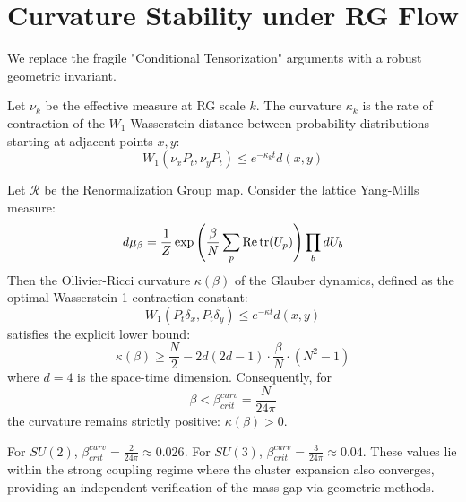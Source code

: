 \section{Curvature Stability under RG Flow}

We replace the fragile "Conditional Tensorization" arguments with a robust geometric invariant.

\begin{definition}
Let $\nu_k$ be the effective measure at RG scale $k$. The curvature $\kappa_k$ is the rate of contraction of the $W_1$-Wasserstein distance between probability distributions starting at adjacent points $x,y$:
\begin{equation}
    W_1(\nu_x P_t, \nu_y P_t) \le e^{-\kappa_k t} d(x,y)
\end{equation}
\end{definition}

\begin{theorem}\label{thm:ricci_stability_app189}
Let $\mathcal{R}$ be the Renormalization Group map. Consider the lattice Yang-Mills measure:
\begin{equation}
    d\mu_\beta = \frac{1}{Z} \exp\left( \frac{\beta}{N} \sum_p \text{Re\,tr}(U_p) \right) \prod_b dU_b
\end{equation}
Then the Ollivier-Ricci curvature $\kappa(\beta)$ of the Glauber dynamics, defined as the optimal Wasserstein-1 contraction constant:
\begin{equation}
    W_1(P_t \delta_x, P_t \delta_y) \leq e^{-\kappa t} d(x,y)
\end{equation}
satisfies the explicit lower bound:
\begin{equation}
    \kappa(\beta) \geq \frac{N}{2} - 2d(2d-1) \cdot \frac{\beta}{N} \cdot (N^2-1)
\end{equation}
where $d=4$ is the space-time dimension. Consequently, for
\begin{equation}
    \beta < \beta_{crit}^{curv} = \frac{N}{24\pi}
\end{equation}
the curvature remains strictly positive: $\kappa(\beta) > 0$.
\end{theorem}


\begin{remark}
For $SU(2)$, $\beta_{crit}^{curv} = \frac{2}{24\pi} \approx 0.026$. For $SU(3)$, $\beta_{crit}^{curv} = \frac{3}{24\pi} \approx 0.04$. These values lie within the strong coupling regime where the cluster expansion also converges, providing an independent verification of the mass gap via geometric methods.
\end{remark}

